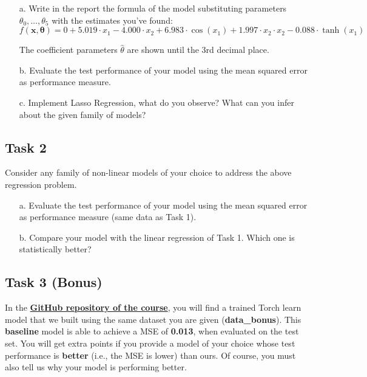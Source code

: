 \documentclass[unicode, 11pt, a4paper]{scrartcl}
\begin{document}
\begin{itemize}
	\item [a.] Write in the report the formula of the model substituting parameters
	      $\theta_0, \ldots, \theta_5$
	      with the estimates you've found:
	      $$f(\mathbf{x}, \boldsymbol{\theta})
		      =  0
		      + 5.019 \cdot x_1
		      - 4.000 \cdot x_2
		      + 6.983 \cdot \cos(x_1)
		      + 1.997 \cdot x_2 \cdot x_2
		      - 0.088 \cdot \tanh(x_1)$$

	      The coefficient parameters $\hat{\theta}$ are shown until the 3rd decimal place.

	\item [b.] Evaluate the test performance of your model using the mean squared error as performance measure.

	\item [c.] Implement Lasso Regression, what do you observe?
	      What can you infer about the given family of models?
\end{itemize}


\subsection*{Task 2}
Consider any family of non-linear models of your choice to address the above regression problem.
\begin{itemize}
	\item [a.] Evaluate the test performance of your model using the mean squared error as performance measure (same data as Task 1).
	\item [b.] Compare your model with the linear regression of Task 1. Which one is {statistically} better?
\end{itemize}

\subsection*{Task 3 (Bonus)}
In the \href{https://github.com/FatimaEzzedinee/ML-bachelor-course-assignments-sp24}{\textbf{GitHub repository of the course}}, you will find a trained Torch learn model that we built using the same dataset you are given (\textbf{data\_bonus}).
This \textbf{baseline} model is able to achieve a MSE of \textbf{0.013}, when evaluated on the test set.
You will get extra points if you provide a model of your choice whose test performance is \textbf{better} (i.e., the MSE is lower) than ours. Of course, you must also tell us why your model is performing better.
\end{document}
